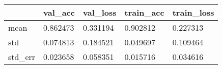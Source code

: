 \begin{tabular}{|l|l|l|l|l|}
\toprule \hline
 & val\_acc & val\_loss & train\_acc & train\_loss \\ \hline
\midrule
mean & 0.862473 & 0.331194 & 0.902812 & 0.227313 \\ \hline
std & 0.074813 & 0.184521 & 0.049697 & 0.109464 \\ \hline
std\_err & 0.023658 & 0.058351 & 0.015716 & 0.034616 \\ \hline
\bottomrule
\end{tabular}
